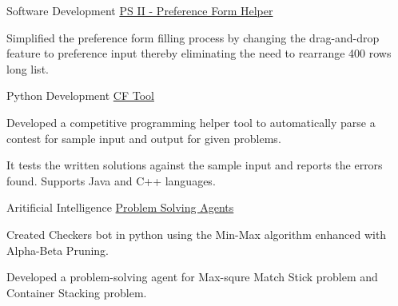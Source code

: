 

\begin{cventries}

  \cventry
    {Software Development} %
    {\href{https://github.com/prashantpiyush/Bits-PS2-form-helper}{PS II - Preference Form Helper}} %
    {} %
    {} %
    {
      \begin{cvitems}
        \item{Simplified the preference form filling process by changing the
         drag-and-drop feature to preference input thereby eliminating the need
         to rearrange 400 rows long list.}
      \end{cvitems}
    }

  \cventry
    {Python Development} %
    {\href{https://github.com/prashantpiyush/cptool}{CF Tool}} %
    {} %
    {} %
    {
      \begin{cvitems}
        \item{Developed a competitive programming helper tool to automatically parse
         a contest for sample input and output for given problems.}
        \item{It tests the written solutions against the sample input and reports
         the errors found. Supports Java and C++ languages.}
      \end{cvitems}
    }

  \cventry
    {Aritificial Intelligence} %
    {\href{https://github.com/prashantpiyush/ai-projects}{Problem Solving Agents}} %
    {} %
    {} %
    {
      \begin{cvitems}
        \item{Created Checkers bot in python using the Min-Max algorithm enhanced with
         Alpha-Beta Pruning.}
        \item{Developed a problem-solving agent for Max-squre Match Stick problem
         and Container Stacking problem.}
      \end{cvitems}
    }


\end{cventries}
